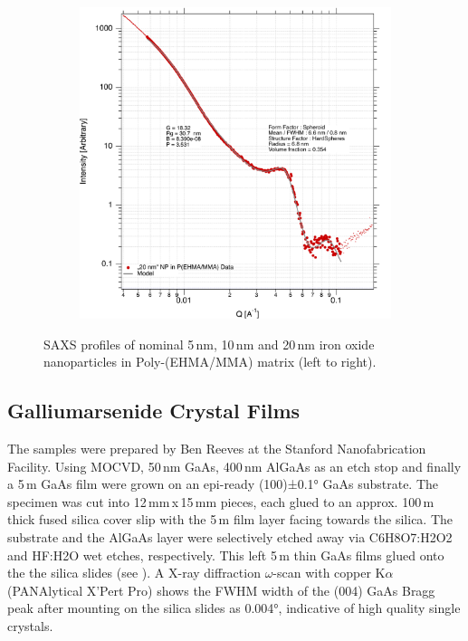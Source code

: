 \begin{figure}[tp]
\begin{subfigure}[b]{0.3\textwidth}
	\end{subfigure}
	\begin{subfigure}[b]{0.3\textwidth}
		\includegraphics[width=\linewidth]{images/pmma20.pdf}
	\end{subfigure}
	
	\caption[SAXS profile of iron oxide nanoparticles in  Poly-(EHMA/MMA) matrix]{SAXS profiles of nominal 5\,nm, 10\,nm and 20\,nm iron oxide nanoparticles in Poly-(EHMA/MMA) matrix (left to right).}
	\label{fig:saxspmma}
\end{figure}
\subsection{Galliumarsenide Crystal Films}
The samples were prepared by Ben Reeves at the Stanford Nanofabrication Facility.
Using MOCVD, 50\,nm GaAs, 400\,nm AlGaAs as an etch stop and finally a 5\,\textmu m GaAs film were grown on an epi-ready (100)±0.1° GaAs substrate. The specimen was cut into 12\,mm\,x\,15\,mm pieces, each glued to an approx. 100\,\textmu m thick fused silica cover slip with the 5\,\textmu m film layer facing towards the silica. The substrate and the AlGaAs layer were selectively etched away via C6H8O7:H2O2 and HF:H2O wet etches, respectively. This left 5\,\textmu m thin GaAs films glued onto the the silica slides (see ). 
A X-ray diffraction $\omega$-scan with copper K$\alpha$ (PANAlytical X’Pert Pro) shows the FWHM width of the (004) GaAs Bragg peak after mounting on the silica slides as 0.004°, indicative of high quality single crystals. 



